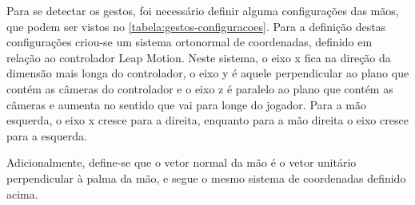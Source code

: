 Para se detectar os gestos, foi necessário definir alguma configurações 
das mãos, que podem ser vistos no \autoref{tabela:gestos-configuracoes}. 
Para a definição destas configurações criou-se um sistema ortonormal 
de coordenadas, definido em relação ao controlador Leap Motion. Neste 
sistema, o eixo x fica na direção da dimensão mais longa do controlador, 
o eixo y é aquele perpendicular ao plano que contém as câmeras do 
controlador e o eixo z é paralelo ao plano que contém as câmeras e 
aumenta no sentido que vai para longe do jogador. Para a mão esquerda, 
o eixo x cresce para a direita, enquanto para a mão direita o eixo cresce 
para a esquerda.

Adicionalmente, define-se que o vetor normal da mão é o vetor unitário 
perpendicular à palma da mão, e segue o mesmo sistema de coordenadas 
definido acima.

